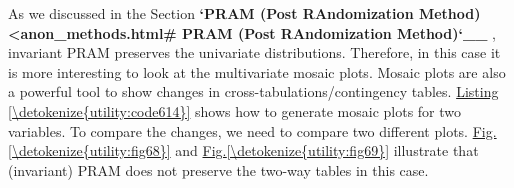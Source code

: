 \documentclass[letterpaper,10pt,english]{sphinxmanual}
\begin{document}
As we discussed in the Section
{\color{red}\bfseries{}{}`PRAM (Post RAndomization Method) \textless{}anon\_methods.html\# PRAM (Post RAndomization Method){}`\_\_}
, invariant PRAM preserves the
univariate distributions. Therefore, in this case it is more interesting
to look at the multivariate mosaic plots. Mosaic plots are also a
powerful tool to show changes in cross-tabulations/contingency tables.
\hyperref[\detokenize{utility:code614}]{Listing \ref{\detokenize{utility:code614}}} shows how to generate mosaic plots for two variables. To
compare the changes, we need to compare two different plots. \hyperref[\detokenize{utility:fig68}]{Fig.\@ \ref{\detokenize{utility:fig68}}}
and \hyperref[\detokenize{utility:fig69}]{Fig.\@ \ref{\detokenize{utility:fig69}}} illustrate that (invariant) PRAM does not preserve the
two-way tables in this case.
\end{document}

